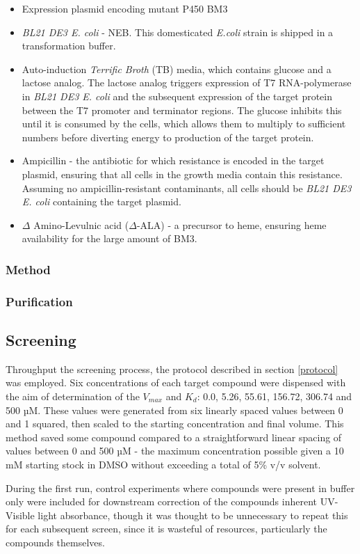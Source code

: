 \documentclass{article}
\begin{document}
\begin{itemize}
	\item Expression plasmid encoding mutant P450 BM3
	\item \textit{BL21 DE3 E. coli} - NEB. This domesticated \textit{E.coli} strain is shipped in a transformation buffer.
	\item Auto-induction \textit{Terrific Broth} (TB) media, which contains glucose and a lactose analog. 
	The lactose analog triggers expression of T7 RNA-polymerase in \textit{BL21 DE3 E. coli} and the subsequent expression of the target protein between the T7 promoter and terminator regions. 
	The glucose inhibits this until it is consumed by the cells, which allows them to multiply to sufficient numbers before diverting energy to production of the target protein.
	\item Ampicillin - the antibiotic for which resistance is encoded in the target plasmid, ensuring that all cells in the growth media contain this resistance.
	Assuming no ampicillin-resistant contaminants, all cells should be \textit{BL21 DE3 E. coli} containing the target plasmid.
	\item $\Delta$ Amino-Levulnic acid ($\Delta$-ALA) - a precursor to heme, ensuring heme availability for the large amount of BM3.
\end{itemize}

\subsubsection{Method}

\subsubsection{Purification}

\subsection{Screening}

Throughput the screening process, the protocol described in section \ref{protocol} was employed.
Six concentrations of each target compound were dispensed with the aim of determination of the $V_{max}$ and $K_d$: 0.0, 5.26, 55.61, 156.72, 306.74 and 500 µM.
These values were generated from six linearly spaced values between 0 and 1 squared, then scaled to the starting concentration and final volume.
This method saved some compound compared to a straightforward linear spacing of values between 0 and 500 µM - the maximum concentration possible given a 10 mM starting stock in DMSO without exceeding a total of 5\% v/v solvent.
\par
During the first run, control experiments where compounds were present in buffer only were included for downstream correction of the compounds inherent UV-Visible light absorbance, though it was thought to be unnecessary to repeat this for each subsequent screen, since it is wasteful of resources, particularly the compounds themselves.
\end{document}
